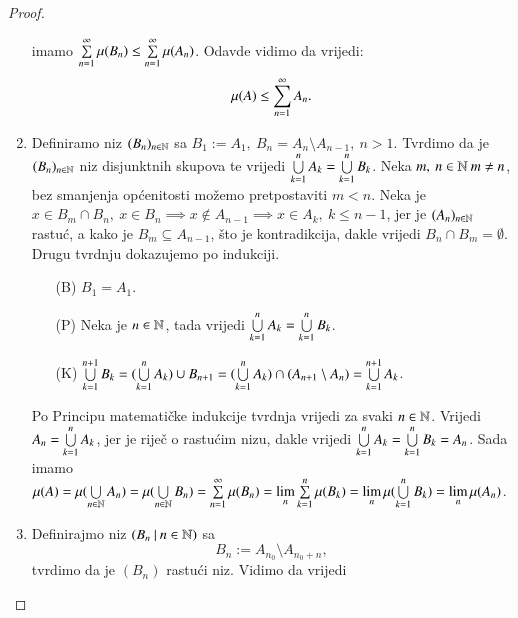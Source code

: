 \begin{proof}
\begin{enumerate}[label={(\roman*)}]
            imamo $\sum\limits_{n=1}^{\infty} \mu({B_n}) \leq \sum\limits_{n=1}^{\infty} \mu({A_n})$.
            Odavde vidimo da vrijedi:
            \begin{equation*}
                \mu({A}) \leq \sum\limits_{n=1}^{\infty} A_n.
            \end{equation*}
        \item Definiramo niz $(B_n)_{n \in \mathbb{N}}$ sa $B_1 := A_1, \: B_n = A_n \setminus
            A_{n-1}, \: n > 1$. Tvrdimo da je $(B_n)_{n \in \mathbb{N}}$ niz disjunktnih skupova
            te vrijedi $\bigcup\limits_{k=1}^{n} A_k = \bigcup\limits_{k=1}^{n} B_k$. Neka $m, \: n \in \mathbb{N}
            \: m \neq n$, bez smanjenja op\' cenitosti mo\v zemo pretpostaviti $m < n$.
            Neka je $x \in B_m \cap B_n, \: x \in B_n \implies x \notin A_{n-1}
            \implies x \in A_k, \: k \leq n-1$, jer je $(A_n)_{n \in \mathbb{N}}$ rastu\' c,
            a kako je $B_m \subseteq A_{n-1}$, \v sto je kontradikcija, dakle vrijedi
            $B_n \cap B_m = \emptyset$. Drugu tvrdnju dokazujemo po indukciji.
            \begin{enumerate}
                \item[(B)] $B_1 = A_1$.
                \item[(P)] Neka je $n \in \mathbb{N}$, tada vrijedi $\bigcup\limits_{k=1}^{n} A_k
                    = \bigcup\limits_{k=1}^{n} B_k$.
                \item[(K)] $\bigcup\limits_{k=1}^{n+1} B_k = (\bigcup\limits_{k=1}^{n} A_k) \cup B_{n+1}
                    = (\bigcup\limits_{k=1}^{n} A_k) \cap (A_{n+1} \setminus A_n)
                    = \bigcup\limits_{k=1}^{n+1} A_k$.
            \end{enumerate}
            Po Principu matemati\v cke indukcije tvrdnja vrijedi za svaki $n \in \mathbb{N}$.
            Vrijedi $A_n = \bigcup\limits_{k=1}^{n} A_k$, jer je rije\v c o rastu\' cim nizu,
            dakle vrijedi $\bigcup\limits_{k=1}^{n} A_k = \bigcup\limits_{k = 1}^{n} B_k = A_n$.
            Sada imamo $\mu({A}) = \mu({\bigcup\limits_{n \in \mathbb{N}}^{} A_n}) = \mu({
                \bigcup\limits_{n \in \mathbb{N}}^{} B_n}) = \sum\limits_{n=1}^{\infty} \mu({B_n})
                = \lim\limits_{n} \sum\limits_{k=1}^{n} \mu({B_k}) = \lim\limits_{n}
                \mu({\bigcup\limits_{k=1}^{n} B_k}) = \lim\limits_{n} \mu({A_n})$.
        \item Definirajmo niz $({B_n} \: | \: {n \in \mathbb{N}})$ sa
        \begin{equation*}
            B_n := A_{n_0} \setminus A_{n_0 + n},
        \end{equation*}
        tvrdimo da je  $(B_n)$ rastu\' ci niz.
        Vidimo da vrijedi
        \begin{equation*}

\end{equation*}
\end{enumerate}
\end{proof}
